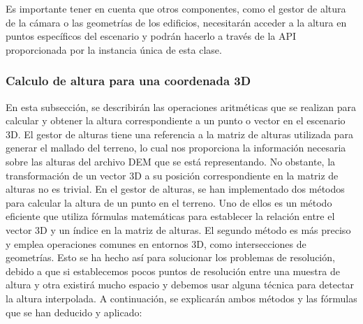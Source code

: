 \documentclass[a4paper, 11pt]{book}
\begin{document}
Es importante tener en cuenta que otros componentes, como el gestor de altura de la cámara o las geometrías de los edificios, necesitarán acceder a la altura en puntos específicos del escenario y podrán hacerlo a través de la \textsc{API} proporcionada por la instancia única de esta clase.
\subsubsection{Calculo de altura para una coordenada 3D}
\label{subsubsec:calculoAltura3D}
En esta subsección, se describirán las operaciones aritméticas que se realizan para calcular y obtener la altura correspondiente a un punto o vector en el escenario 3D. El gestor de alturas tiene una referencia a la matriz de alturas utilizada para generar el mallado del terreno, lo cual nos proporciona la información necesaria sobre las alturas del archivo \textsc{DEM} que se está representando. No obstante, la transformación de un vector 3D a su posición correspondiente en la matriz de alturas no es trivial.
En el gestor de alturas, se han implementado dos métodos para calcular la altura de un punto en el terreno. Uno de ellos es un método eficiente que utiliza fórmulas matemáticas para establecer la relación entre el vector \textsc{3D} y un índice en la matriz de alturas. El segundo método es más preciso y emplea operaciones comunes en entornos \textsc{3D}, como intersecciones de geometrías. Esto se ha hecho así para solucionar los problemas de resolución, debido a que si establecemos pocos puntos de resolución entre una muestra de altura y otra existirá mucho espacio y debemos usar alguna técnica para detectar la altura interpolada.
A continuación, se explicarán ambos métodos y las fórmulas que se han deducido y aplicado:
\end{document}
